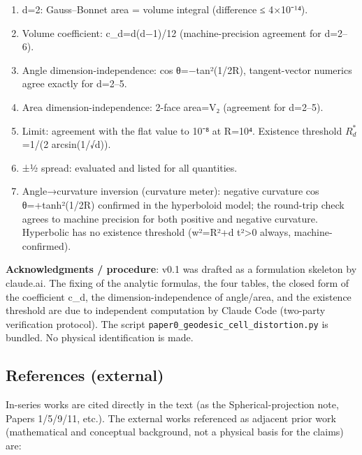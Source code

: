 \documentclass[
]{ltjsarticle}
\providecommand{\tightlist}{%
  \setlength{\itemsep}{0pt}\setlength{\parskip}{0pt}}
\begin{document}
\begin{enumerate}
\def\labelenumi{\arabic{enumi}.}
\tightlist
\item
  d=2: Gauss--Bonnet area = volume integral (difference ≤ 4×10⁻¹⁴).
\item
  Volume coefficient: c\_d=d(d−1)/12 (machine-precision agreement for
  d=2--6).
\item
  Angle dimension-independence: cos θ=−tan²(1/2R), tangent-vector
  numerics agree exactly for d=2--5.
\item
  Area dimension-independence: 2-face area=V₂ (agreement for d=2--5).
\item
  Limit: agreement with the flat value to 10⁻⁸ at R=10⁴. Existence
  threshold \(R^{*}_{d}\)=1/(2 arcsin(1/√d)).
\item
  ±½ spread: evaluated and listed for all quantities.
\item
  Angle→curvature inversion (curvature meter): negative curvature cos
  θ=+tanh²(1/2R) confirmed in the hyperboloid model; the round-trip
  check agrees to machine precision for both positive and negative
  curvature. Hyperbolic has no existence threshold (w²=R²+d
  t²\textgreater0 always, machine-confirmed).
\end{enumerate}

\textbf{Acknowledgments / procedure}: v0.1 was drafted as a formulation
skeleton by claude.ai. The fixing of the analytic formulas, the four
tables, the closed form of the coefficient c\_d, the
dimension-independence of angle/area, and the existence threshold are
due to independent computation by Claude Code (two-party verification
protocol). The script \texttt{paper0\_geodesic\_cell\_distortion.py} is
bundled. No physical identification is made.

\subsection{References (external)}\label{references-external}

In-series works are cited directly in the text (as the
Spherical-projection note, Papers 1/5/9/11, etc.). The external works
referenced as adjacent prior work (mathematical and conceptual
background, not a physical basis for the claims) are:
\end{document}
